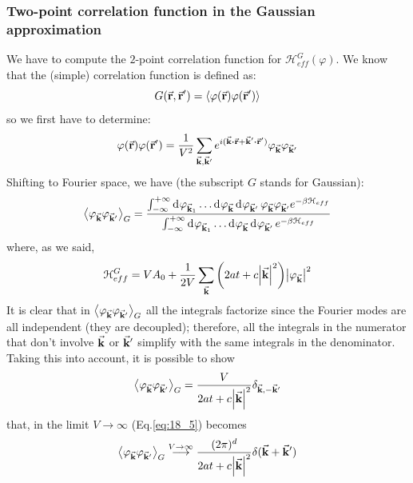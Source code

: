 \documentclass[../../Main/Main.tex]{subfiles}
\begin{document}
\subsubsection{Two-point correlation function in the Gaussian approximation}
We have to compute the  \( 2 \)-point correlation function for \( \mathcal{H}_{eff}^G (\varphi) \).
We know that the (simple)  correlation function is defined as:
\begin{equation*}
  G ( \va{r}, \va{r}') = \expval{ \varphi(\va{r})\varphi(\va{r}')}
\end{equation*}
so we first have to determine:
\begin{equation*}
   \varphi(\va{r})\varphi(\va{r}') = \frac{1}{V^2} \sum_{\va{k}, \va{k}'}^{}
   e^{i (\va{k} \vdot \va{r} + \va{k}' \vdot \va{r}')} \varphi_{\va{k}} \varphi_{\va{k}'}
\end{equation*}
Shifting to Fourier space, we have (the subscript \( G \) stands for Gaussian):
\begin{equation*}
  \expval{\varphi _{\va{k}} \varphi _{\va{k}'}}_G =
\frac{\int_{- \infty }^{+ \infty } \dd[]{  \varphi_{\va{k}_1} }  \dots
  \dd[]{  \varphi_{\va{k}} }  \dd[]{ \varphi_{\va{k}'} }
   \varphi_{\va{k}} \varphi_{\va{k}'} e^{- \beta \mathcal{H}_{eff}}
 }{
 \int_{- \infty }^{+ \infty } \dd[]{  \varphi_{\va{k}_1} }  \dots
   \dd[]{  \varphi_{\va{k}} }  \dd[]{ \varphi_{\va{k}'} }
    e^{- \beta \mathcal{H}_{eff}}
 }
\end{equation*}
where, as we said,
\begin{equation*}
  \mathcal{H}_{eff}^G = V A_0  + \frac{1}{2V} \sum_{\va{k}}^{} \qty(2 a t + c  \abs{\va{k}}^2) \abs{\varphi _{\va{k}}}^2
\end{equation*}
It is clear that in \(   \expval{\varphi _{\va{k}} \varphi _{\va{k}'}}_G  \)  all the integrals factorize since the Fourier modes are all independent (they are decoupled); therefore, all the integrals in the numerator that don't involve \( \va{k} \) or \( \va{k}' \) simplify with the same integrals in the denominator. Taking this into account, it is possible to show
\begin{equation*}
  \expval{\varphi _{\va{k}} \varphi _{\va{k}'}}_G =  \frac{V}{2 a t + c \abs{\va{k}}^2} \delta _{\va{k},-\va{k}'}
\end{equation*}
that, in the limit \( V \rightarrow \infty  \) (Eq.\eqref{eq:18_5}) becomes
\begin{equation}
    \expval{\varphi _{\va{k}} \varphi _{\va{k}'}}_G \overset{V \rightarrow \infty }{\longrightarrow} \frac{(2 \pi )^d}{2 a t + c \abs{\va{k}}^2} \delta  (\va{k}+ \va{k}')
\end{equation}
\end{document}
